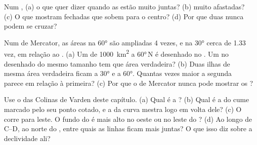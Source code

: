 \begin{exercise}[$\star$]\label{exo:g9:maps-of-the-earth:4}
Num , (a) o que quer dizer quando as 
estão muito juntas? (b) muito afastadas? (c) O que mostram 
fechadas que sobem para o centro? (d) Por que duas  nunca
podem se cruzar?
\end{exercise}

\begin{exercise}[$\star\star$]\label{exo:g9:maps-of-the-earth:5}
Num  de Mercator, as áreas na  \ang{60} são ampliadas 4 vezes,
e na  \ang{30} cerca de 1.33 vez, em relação ao . (a) Um
 de \qty{1000}{km^2} a \ang{60}\,N é desenhado no . Um  no
 desenhado do mesmo tamanho tem que área verdadeira? (b) Duas ilhas
de mesma área verdadeira ficam a \ang{30} e a \ang{60}. Quantas vezes
maior a segunda parece em relação à primeira? (c) Por que o  de
Mercator nunca pode mostrar os ?
\end{exercise}

\begin{exercise}[$\star\star$]\label{exo:g9:maps-of-the-earth:6}
Use o  das Colinas de Varden deste capítulo. (a) Qual é a
? (b) Qual é a  do cume marcado pelo seu ponto
cotado, e a da curva mestra logo em volta dele? (c) O  corre para
leste. O fundo do  é mais alto no oeste ou no leste do ? (d) Ao
longo de C--D, ao norte do , entre quais  as linhas
ficam mais juntas? O que isso diz sobre a declividade ali?
\end{exercise}

